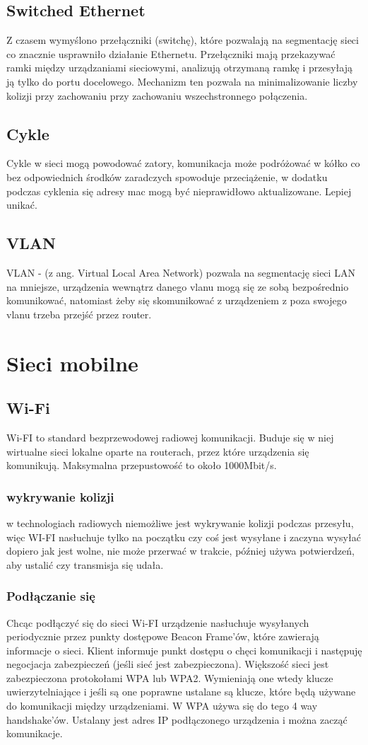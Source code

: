 \documentclass[]{article}
\begin{document}
\subsection{Switched Ethernet}
Z czasem wymyślono przełączniki (switchę), które pozwalają na segmentację sieci co znacznie usprawniło działanie Ethernetu. Przełączniki mają przekazywać ramki między urządzaniami sieciowymi, analizują otrzymaną ramkę i przesyłają ją tylko do portu docelowego. Mechanizm ten pozwala na minimalizowanie liczby kolizji przy zachowaniu przy zachowaniu wszechstronnego połączenia.
\subsection{Cykle}
Cykle w sieci mogą powodować zatory, komunikacja może podróżować w kółko co bez odpowiednich środków zaradczych spowoduje przeciążenie, w dodatku podczas cyklenia się adresy mac mogą być nieprawidłowo aktualizowane. Lepiej unikać.
\subsection{VLAN}
VLAN - (z ang. Virtual Local Area Network) pozwala na segmentację sieci LAN na mniejsze, urządzenia wewnątrz danego vlanu mogą się ze sobą bezpośrednio komunikować, natomiast żeby się skomunikować z urządzeniem z poza swojego vlanu trzeba przejść przez router.
\section{Sieci mobilne}
\subsection{Wi-Fi}
Wi-FI to standard bezprzewodowej radiowej komunikacji. Buduje się w niej wirtualne sieci lokalne oparte na routerach, przez które urządzenia się komunikują. Maksymalna przepustowość to około 1000Mbit/s.
\subsubsection{wykrywanie kolizji}
w technologiach radiowych niemożliwe jest wykrywanie kolizji podczas przesyłu, więc WI-FI nasłuchuje tylko na początku czy coś jest wysyłane i zaczyna wysyłać dopiero jak jest wolne, nie może przerwać w trakcie, później używa
potwierdzeń, aby ustalić czy transmisja się udała.
\subsubsection{Podłączanie się}
Chcąc podłączyć się do sieci Wi-FI urządzenie nasłuchuje wysyłanych periodycznie przez punkty dostępowe Beacon Frame'ów, które zawierają informacje o sieci. Klient informuje punkt dostępu o chęci komunikacji i następuję negocjacja zabezpieczeń (jeśli sieć jest zabezpieczona). Większość sieci jest zabezpieczona protokołami WPA lub WPA2. Wymieniają one wtedy klucze uwierzytelniające i jeśli są one poprawne ustalane są klucze, które będą używane do komunikacji między urządzeniami. W WPA używa się do tego 4 way handshake'ów. Ustalany jest adres IP podłączonego urządzenia i można zacząć komunikacje.
\end{document}
